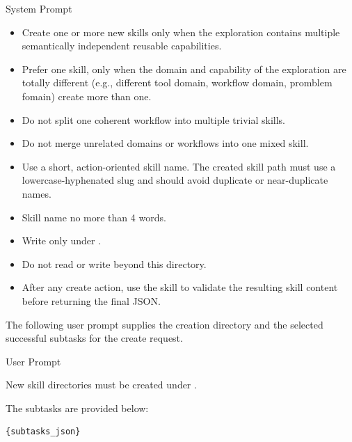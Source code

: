 \begin{svpromptbox}{System Prompt}
\begin{itemize}
\item Create one or more new skills only when the exploration contains multiple semantically independent reusable capabilities.
\item Prefer one skill, only when the domain and capability of the exploration are totally different (e.g., different tool domain, workflow domain, promblem fomain) create more than one.
\item Do not split one coherent workflow into multiple trivial skills.
\item Do not merge unrelated domains or workflows into one mixed skill.
\item Use a short, action-oriented skill name. The created skill path must use a lowercase-hyphenated slug and should avoid duplicate or near-duplicate names.
\item Skill name no more than 4 words.
\end{itemize}
\smallskip
{}
\smallskip
\begin{itemize}
\item Write only under .
\item Do not read or write beyond this directory.
\item After any create action, use the  skill to validate the resulting skill content before returning the final JSON.
\end{itemize}

\end{svpromptbox}

\noindent The following user prompt supplies the creation directory and the selected successful subtasks for the create request.\par

\begin{svpromptbox}{User Prompt}

New skill directories must be created under .\par
\smallskip
The subtasks are provided below:\par
\smallskip
\begin{lstlisting}[style=svpromptcode]
{subtasks_json}
\end{lstlisting}

\end{svpromptbox}

